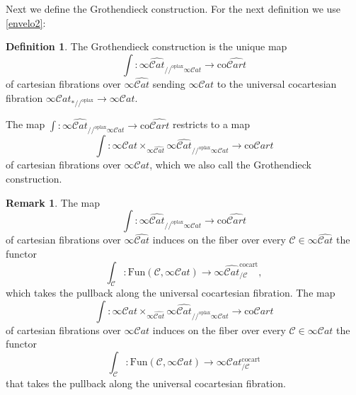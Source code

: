 \documentclass[10pt,oneside]{article}
\numberwithin{equation}{section} %
\numberwithin{figure}{section} %
\theoremstyle{plain}
\theoremstyle{definition}
\newtheorem{definition}[theorem]{Definition}
\newtheorem{remark}[theorem]{Remark}
\newcommand{\mC}{{\mathcal C}}
\newcommand{\co}{\mathrm{co}}
\newcommand{\Fun}{\mathrm{Fun}}
\newcommand{\cocart}{{\mathrm{cocart}}}
\newcommand{\oplax}{{\mathrm{oplax}}}
\newcommand{\scat}{\mathcal{C}\mathit{at}}
\begin{document}
Next we define the Grothendieck construction.
For the next definition we use \cref{envelo2}:

\begin{definition}

The Grothendieck construction is the unique map
$$\int: \infty\widehat{\scat}_{//^\oplax \infty\scat} \to \co\widehat{\mathcal{C}\mathit{art}}$$
of cartesian fibrations over
$\infty\widehat{\scat}$ sending $\infty\scat$ to the universal cocartesian fibration $ \infty\scat_{*//^\oplax} \to \infty\scat.$

The map $\int: \infty\widehat{\scat}_{//^\oplax \infty\scat} \to \co\widehat{\mathcal{C}\mathit{art}}$ 
restricts to a map 
\begin{equation}\label{smallGroCon}
\int: \infty\scat \times_{\infty\widehat{\scat}} \infty\widehat{\scat}_{//^\oplax \infty\scat} \to \co\mathcal{C}\mathit{art}
\end{equation} of cartesian fibrations over $\infty\scat$,
which we also call the Grothendieck construction.

\end{definition}

\begin{remark}
The map $$\int: \infty\widehat{\scat}_{//^\oplax \infty\scat} \to \co\widehat{\mathcal{C}\mathit{art}}$$ of cartesian fibrations over
$\infty\widehat{\scat}$ induces on the fiber over every $\mC \in \infty\widehat{\scat}$ the functor
$$\int_\mC: \Fun(\mC, \infty\scat) \to \infty\widehat{\scat}^\cocart_{/\mC}, $$
which takes the pullback along the universal cocartesian fibration.
The map 
\begin{equation}
\int: \infty\scat \times_{\infty\widehat{\scat}} \infty\widehat{\scat}_{//^\oplax \infty\scat} \to \co\mathcal{C}\mathit{art}
\end{equation} of cartesian fibrations over $\infty\scat$ induces on the fiber over every $\mC \in \infty\scat$ the functor
$$\int_\mC : \Fun(\mC, \infty\scat) \to \infty\scat^\cocart_{/\mC}$$
that takes the pullback along the universal cocartesian fibration.

\end{remark}
\end{document}
